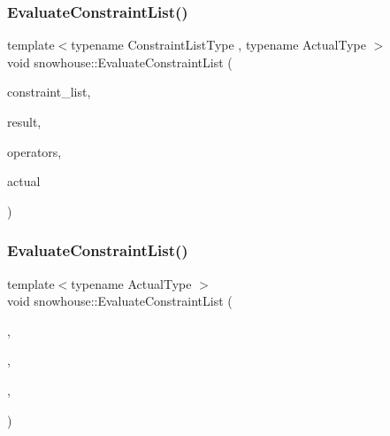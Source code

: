 \subsubsection{\texorpdfstring{EvaluateConstraintList()}{EvaluateConstraintList()}\hspace{0.1cm}{\footnotesize\ttfamily [1/2]}}
{\footnotesize\ttfamily template$<$typename Constraint\+List\+Type , typename Actual\+Type $>$ \\
void snowhouse\+::\+Evaluate\+Constraint\+List (\begin{DoxyParamCaption}\item[{Constraint\+List\+Type \&}]{constraint\+\_\+list,  }\item[{\mbox{\hyperlink{namespacesnowhouse_a719169b1315a13161c15f25e600a8f51}{Result\+Stack}} \&}]{result,  }\item[{\mbox{\hyperlink{namespacesnowhouse_adcb10e215e6a4bbcb35722a9c7270fc6}{Operator\+Stack}} \&}]{operators,  }\item[{const Actual\+Type \&}]{actual }\end{DoxyParamCaption})\hspace{0.3cm}{\ttfamily [inline]}}

\mbox{\label{namespacesnowhouse_a01bed343b418b0f747e41dee35669659}} 
\subsubsection{\texorpdfstring{EvaluateConstraintList()}{EvaluateConstraintList()}\hspace{0.1cm}{\footnotesize\ttfamily [2/2]}}
{\footnotesize\ttfamily template$<$typename Actual\+Type $>$ \\
void snowhouse\+::\+Evaluate\+Constraint\+List (\begin{DoxyParamCaption}\item[{\mbox{\hyperlink{structsnowhouse_1_1Nil}{Nil}} \&}]{,  }\item[{\mbox{\hyperlink{namespacesnowhouse_a719169b1315a13161c15f25e600a8f51}{Result\+Stack}} \&}]{,  }\item[{\mbox{\hyperlink{namespacesnowhouse_adcb10e215e6a4bbcb35722a9c7270fc6}{Operator\+Stack}} \&}]{,  }\item[{const Actual\+Type \&}]{ }\end{DoxyParamCaption})\hspace{0.3cm}{\ttfamily [inline]}}

